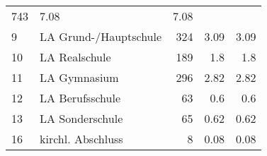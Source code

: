 \begin{longtable}{lXrrr}
       \num{743} &
       \num[round-mode=places,round-precision=2]{7,08} &
         \num[round-mode=places,round-precision=2]{7,08} \\

     9 &
     \multicolumn{1}{X}{ LA Grund-/Hauptschule   } &


       \num{324} &
       \num[round-mode=places,round-precision=2]{3,09} &
         \num[round-mode=places,round-precision=2]{3,09} \\

     10 &
     \multicolumn{1}{X}{ LA Realschule   } &


       \num{189} &
       \num[round-mode=places,round-precision=2]{1,8} &
         \num[round-mode=places,round-precision=2]{1,8} \\

     11 &
     \multicolumn{1}{X}{ LA Gymnasium   } &


       \num{296} &
       \num[round-mode=places,round-precision=2]{2,82} &
         \num[round-mode=places,round-precision=2]{2,82} \\

     12 &
     \multicolumn{1}{X}{ LA Berufsschule   } &


       \num{63} &
       \num[round-mode=places,round-precision=2]{0,6} &
         \num[round-mode=places,round-precision=2]{0,6} \\

     13 &
     \multicolumn{1}{X}{ LA Sonderschule   } &


       \num{65} &
       \num[round-mode=places,round-precision=2]{0,62} &
         \num[round-mode=places,round-precision=2]{0,62} \\

     16 &
     \multicolumn{1}{X}{ kirchl. Abschluss   } &


       \num{8} &
       \num[round-mode=places,round-precision=2]{0,08} &
         \num[round-mode=places,round-precision=2]{0,08} \\


\end{longtable}
